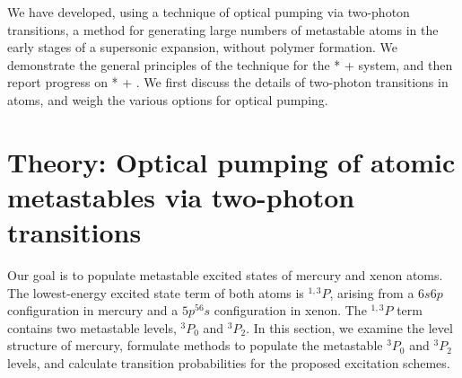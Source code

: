 \documentclass[12pt]{mitthesis}
\begin{document}
We have developed, using a technique of optical pumping via two-photon
transitions, a method for generating large numbers of metastable atoms
in the early stages of a supersonic expansion, without polymer
formation.  We demonstrate the general principles of the technique for
the * +  system, and then report progress on
* + .  We first discuss the details of two-photon
transitions in atoms, and weigh the various options for optical
pumping.

\section{Theory: Optical pumping of atomic metastables via two-photon
  transitions}

Our goal is to populate metastable excited states of mercury and xenon
atoms.  The lowest-energy excited state term of both atoms is
$^{1,3}P$, arising from a $6s6p$ configuration in mercury and a
$5p^56s$ configuration in xenon.  The $^{1,3}P$ term contains two
metastable levels, $^3P_0$ and $^3P_2$.  In this section, we examine
the level structure of mercury, formulate methods to populate the
metastable $^3P_0$ and $^3P_2$ levels, and calculate transition
probabilities for the proposed excitation schemes.
\end{document}
